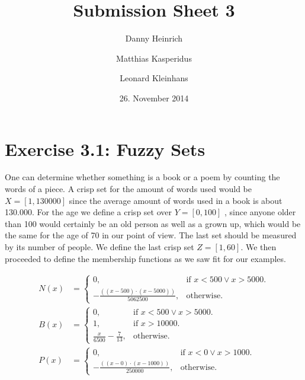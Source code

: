 \documentclass[a4paper]{scrartcl}
\title{Submission Sheet 3}
\author{Danny Heinrich \and Matthias Kasperidus \and Leonard Kleinhans}
\date{26. November 2014}
\begin{document}
\maketitle

\section{Exercise 3.1: Fuzzy Sets}

One can determine whether something is a book or a poem by counting the words of a piece. A crisp set for the amount of words used would be $X=[1,130000]$ since the average amount of words used in a book is about 130.000. For the age we define a crisp set over $Y = [0,100]$ , since anyone older than 100 would certainly be an old person as well as a grown up, which would be the same for the age of 70 in our point of view. The last set should be measured by its number of people. We define the last crisp set $Z=[1,60]$. We then proceeded to define the membership functions as we saw fit for our examples.

\begin{align*}
 N(x)&=\begin{cases}
    0, & \text{if $x<500 \vee x>5000$}.\\
    -\frac{((x-500) \cdot (x-5000))}{5062500}, &        \text{otherwise}.
    \end{cases} \\
 B(x)&=\begin{cases}
    0, & \text{if $x<500 \vee x>5000$}.\\
    1, & \text{if $x>10000$}. \\
    \frac{x}{6500}-\frac{7}{13}, & \text{otherwise}.
  \end{cases} \\
    P(x)&=\begin{cases}
        0, & \text{if $x<0 \vee x>1000$}.\\
        -\frac{((x-0) \cdot (x-1000))}{250000}, & \text{otherwise}.
    \end{cases}
\end{align*}
\end{document}
